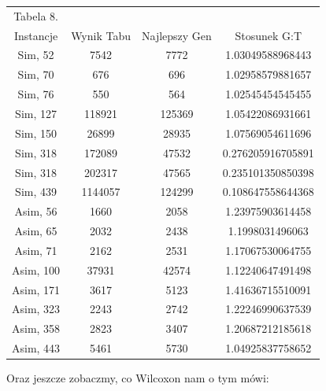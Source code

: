 \documentclass{article}
\begin{document}
\begin{table}[h!]
	\centering
	\begin{tabular}{c||c|c|c}
Tabela 8.\\
Instancje & Wynik Tabu & Najlepszy Gen & Stosunek G:T\\
\hline
Sim, 52 & 7542 & 7772 & 1.03049588968443 \\
Sim, 70 & 676 & 696 & 1.02958579881657 \\
Sim, 76 & 550 & 564 & 1.02545454545455 \\
Sim, 127 & 118921 & 125369 & 1.05422086931661 \\
Sim, 150 & 26899 & 28935 & 1.07569054611696 \\
Sim, 318 & 172089 & 47532 & 0.276205916705891 \\
Sim, 318 & 202317 & 47565 & 0.235101350850398 \\
Sim, 439 & 1144057 & 124299 & 0.108647558644368 \\
Asim, 56 & 1660 & 2058 & 1.23975903614458 \\
Asim, 65 & 2032 & 2438 & 1.1998031496063 \\
Asim, 71 & 2162 & 2531 & 1.17067530064755 \\
Asim, 100 & 37931 & 42574 & 1.12240647491498 \\
Asim, 171 & 3617 & 5123 & 1.41636715510091 \\
Asim, 323 & 2243 & 2742 & 1.22246990637539 \\
Asim, 358 & 2823 & 3407 & 1.20687212185618 \\
Asim, 443 & 5461 & 5730 & 1.04925837758652 \\


	\end{tabular}
\end{table}

Oraz jeszcze zobaczmy, co Wilcoxon nam o tym mówi:

\newpage
\end{document}
